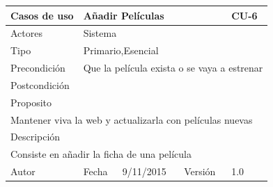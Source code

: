 \documentclass{article}
\begin{document}
\begin{table}[h]
\begin{tabular}{|l|l|l|l|l|l|}
\hline
\multicolumn{2}{|p{2cm}|}{Casos de uso}  & \multicolumn{3}{p{7cm}|}{Añadir Películas} & CU-6 \\
\hline
\multicolumn{2}{|p{2cm}|}{Actores}       & \multicolumn{4}{p{8cm}|}{Sistema}        \\
\hline
\multicolumn{2}{|p{2cm}|}{Tipo}          & \multicolumn{4}{p{8cm}|}{Primario,Esencial}        \\
\hline
\multicolumn{2}{|p{2cm}|}{Precondición}  & \multicolumn{4}{p{8cm}|}{Que la película exista o se vaya a estrenar}        \\
\hline
\multicolumn{2}{|p{2cm}|}{Postcondición} & \multicolumn{4}{p{8cm}|}{}        \\
\hline
\multicolumn{6}{|p{10cm}|}{Proposito}                                   \\
\hline
\multicolumn{6}{|p{10cm}|}{Mantener viva la web y actualizarla con películas nuevas}                                            \\
\hline
\multicolumn{6}{|p{10cm}|}{Descripción}                                 \\
\hline
\multicolumn{6}{|p{10cm}|}{Consiste en añadir la ficha de una película}                                            \\
\hline
Autor              &              & Fecha    &  9/11/2015   &   Versión  &1.0\\
\hline
\end{tabular}
\end{table}

\clearpage
\end{document}
